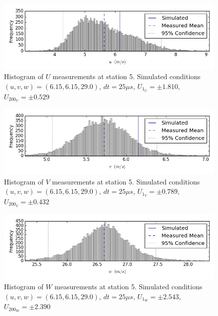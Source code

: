 \begin{figure}[H]
\centering
\includegraphics[width=6in]{figs/Ely_May28th05001/uncertainty_Ely_May28th05001_U}
\caption{Histogram of $U$ measurements at station 5. Simulated conditions $(u,v,w)=(6.15, 6.15, 29.0)$, $dt=25 \mu s$, $U_1_U=\pm 1.810$, $U_200_U=\pm 0.529$}
\label{fig:uncertainty_Ely_May28th05001_U}
\end{figure}


\begin{figure}[H]
\centering
\includegraphics[width=6in]{figs/Ely_May28th05001/uncertainty_Ely_May28th05001_V}
\caption{Histogram of $V$ measurements at station 5. Simulated conditions $(u,v,w)=(6.15, 6.15, 29.0)$, $dt=25 \mu s$, $U_1_V=\pm 0.789$, $U_200_V=\pm 0.432$}
\label{fig:uncertainty_Ely_May28th05001_V}
\end{figure}


\begin{figure}[H]
\centering
\includegraphics[width=6in]{figs/Ely_May28th05001/uncertainty_Ely_May28th05001_W}
\caption{Histogram of $W$ measurements at station 5. Simulated conditions $(u,v,w)=(6.15, 6.15, 29.0)$, $dt=25 \mu s$, $U_1_W=\pm 2.543$, $U_200_W=\pm 2.390$}
\label{fig:uncertainty_Ely_May28th05001_W}
\end{figure}


